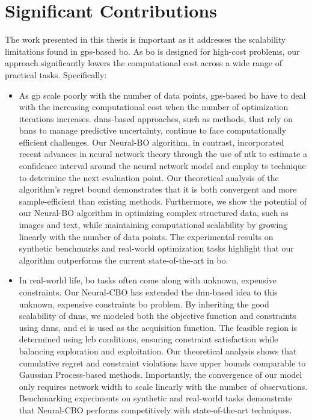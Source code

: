 \section{Significant Contributions}
The work presented in this thesis is important as it addresses the scalability limitations found in \acp{gp}-based \acf{bo}. As \ac{bo} is designed for high-cost problems, our approach significantly lowers the computational cost across a wide range of practical tasks. Specifically: 
\begin{itemize}
    \item As \ac{gp} scale poorly with the number of data points, \acp{gp}-based \ac{bo} have to deal with the increasing computational cost when the number of optimization iterations increases. \acp{dnn}-based approaches, such as methods, that rely on \acp{bnn} to manage predictive uncertainty, continue to face computationally efficient challenges. Our Neural-BO algorithm, in contrast,  incorporated recent advances in neural network theory through the use of \ac{ntk} to estimate a confidence interval around the neural network model and employ \acl{ts} technique to determine the next evaluation point. Our theoretical analysis of the algorithm's regret bound demonstrates that it is both convergent and more sample-efficient than existing methods. Furthermore, we show the potential of our Neural-BO algorithm in optimizing complex structured data, such as images and text, while maintaining computational scalability by growing linearly with the number of data points. The experimental results on synthetic benchmarks and real-world optimization tasks highlight that our algorithm outperforms the current state-of-the-art in \ac{bo}.  
    \item In real-world life, \ac{bo} tasks often come along with unknown, expensive constraints. Our Neural-CBO has extended the \ac{dnn}-based idea to this unknown, expensive constraints \ac{bo} problem. By inheriting the good scalability of \acp{dnn},  we modeled both the objective function and constraints using \acp{dnn}, and \ac{ei} is used as the acquisition function. The feasible region is determined using \ac{lcb} conditions, ensuring constraint satisfaction while balancing exploration and exploitation. Our theoretical analysis shows that cumulative regret and constraint violations have upper bounds comparable to Gaussian Process-based methods. Importantly, the convergence of our model only requires network width to scale linearly with the number of observations. Benchmarking experiments on synthetic and real-world tasks demonstrate that Neural-CBO performs competitively with state-of-the-art techniques. 

\end{itemize}
